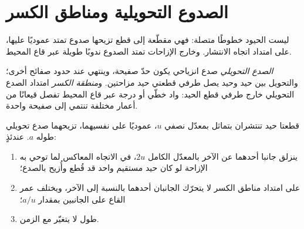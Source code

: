 \section{الصدوع التحويلية ومناطق الكسر}

ليست الحيود خطوطًا متصلة: فهي مقطّعة إلى قطع تزيحها صدوع تمتد عموديًا عليها، على امتداد اتجاه الانتشار. وخارج الإزاحات تمتد الصدوع ندوبًا طويلة عبر قاع المحيط.

\begin{definition}\label{def:b1:rifts-ridges-margins:transform}
\emph{الصدع التحويلي} صدع انزياحي يكون حدّ صفيحة، وينتهي عند حدود صفائح أخرى؛ والتحويل بين حيد وحيد يصل طرفي قطعتي حيد مزاحتين. و\emph{منطقة الكسر} امتداد الصدع التحويلي خارج طرفي قطع الحيد: واد خطّي أو درجة عبر قاع المحيط تفصل قيعانًا من أعمار مختلفة تنتمي إلى صفيحة واحدة.
\end{definition}

\begin{proposition}\label{prop:b1:rifts-ridges-margins:transform}
قطعتا حيد تنتشران بتماثل بمعدّل نصفي $u$، عموديًا على نفسيهما، تزيحهما صدع تحويلي طوله $a$. عندئذٍ:
\begin{enumerate}
  \item ينزلق جانبا  أحدهما عن الآخر بالمعدّل الكامل $2u$، في الاتجاه المعاكس لما توحي به الإزاحة لو كان حيد مستقيم واحد قد قُطع وأُزيح بالصدع؛
  \item على امتداد مناطق الكسر لا يتحرّك الجانبان أحدهما بالنسبة إلى الآخر، ويختلف عمر القاع على الجانبين بمقدار $a/u$؛
  \item طول  لا يتغيّر مع الزمن.
\end{enumerate}
\end{proposition}

